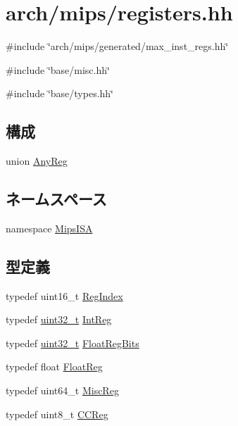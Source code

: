 \hypertarget{mips_2registers_8hh}{
\section{arch/mips/registers.hh}
\label{mips_2registers_8hh}
}
{\ttfamily \#include \char`\"{}arch/mips/generated/max\_\-inst\_\-regs.hh\char`\"{}}\par
{\ttfamily \#include \char`\"{}base/misc.hh\char`\"{}}\par
{\ttfamily \#include \char`\"{}base/types.hh\char`\"{}}\par
\subsection*{構成}
\begin{DoxyCompactItemize}
\item 
union \hyperlink{unionMipsISA_1_1AnyReg}{AnyReg}
\end{DoxyCompactItemize}
\subsection*{ネームスペース}
\begin{DoxyCompactItemize}
\item 
namespace \hyperlink{namespaceMipsISA}{MipsISA}
\end{DoxyCompactItemize}
\subsection*{型定義}
\begin{DoxyCompactItemize}
\item 
typedef uint16\_\-t \hyperlink{namespaceMipsISA_a69329e1d929a534ff51be6cf8216b69a}{RegIndex}
\item 
typedef \hyperlink{Type_8hh_a435d1572bf3f880d55459d9805097f62}{uint32\_\-t} \hyperlink{namespaceMipsISA_adf027691dfdcdef6002693b1e033700d}{IntReg}
\item 
typedef \hyperlink{Type_8hh_a435d1572bf3f880d55459d9805097f62}{uint32\_\-t} \hyperlink{namespaceMipsISA_acc2693113a7cf1a4ff1c9d63b7de6451}{FloatRegBits}
\item 
typedef float \hyperlink{namespaceMipsISA_a449d6bb660f5ca613cf359f05d81a20f}{FloatReg}
\item 
typedef uint64\_\-t \hyperlink{namespaceMipsISA_aa16539aa6584fd12f7d6fa868f75b4de}{MiscReg}
\item 
typedef uint8\_\-t \hyperlink{namespaceMipsISA_a5834599c0196ce4accda8049e7320621}{CCReg}
\end{DoxyCompactItemize}
